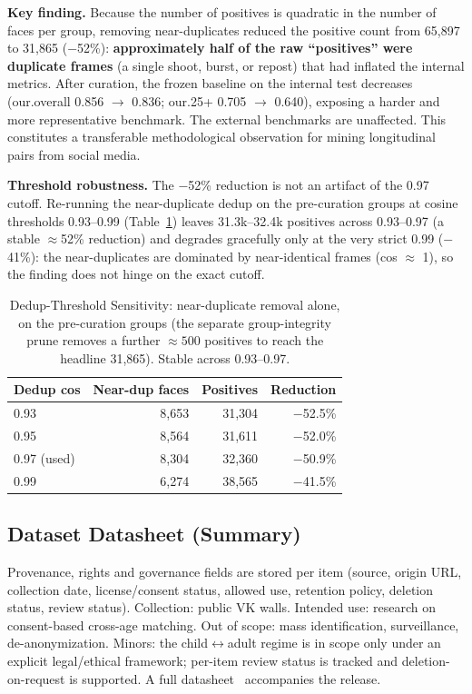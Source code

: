 \documentclass[journal]{IEEEtran}
\begin{document}
\textbf{Key finding.} Because the number of positives is quadratic in the number of faces per group, removing near-duplicates reduced the positive count from 65{,}897 to 31{,}865 ($-$52\%): \textbf{approximately half of the raw ``positives'' were duplicate frames} (a single shoot, burst, or repost) that had inflated the internal metrics. After curation, the frozen baseline on the internal test decreases (our.overall 0.856 $\rightarrow$ 0.836; our.25+ 0.705 $\rightarrow$ 0.640), exposing a harder and more representative benchmark. The external benchmarks are unaffected. This constitutes a transferable methodological observation for mining longitudinal pairs from social media.

\textbf{Threshold robustness.} The $-$52\% reduction is not an artifact of the 0.97 cutoff. Re-running the near-duplicate dedup on the pre-curation groups at cosine thresholds 0.93--0.99 (Table~\ref{tab:dedupsens}) leaves 31.3k--32.4k positives across 0.93--0.97 (a stable $\approx$52\% reduction) and degrades gracefully only at the very strict 0.99 ($-$41\%): the near-duplicates are dominated by near-identical frames (cos $\approx$ 1), so the finding does not hinge on the exact cutoff.

\begin{table}[!t]
\renewcommand{\arraystretch}{1.2}
\caption{Dedup-Threshold Sensitivity: near-duplicate removal alone, on the pre-curation groups (the separate group-integrity prune removes a further ${\approx}500$ positives to reach the headline 31{,}865). Stable across 0.93--0.97.}
\label{tab:dedupsens}
\centering
\footnotesize
\begin{tabular}{@{}lrrr@{}}
\toprule
Dedup cos & Near-dup faces & Positives & Reduction \\
\midrule
0.93 & 8{,}653 & 31{,}304 & $-$52.5\% \\
0.95 & 8{,}564 & 31{,}611 & $-$52.0\% \\
0.97 (used) & 8{,}304 & 32{,}360 & $-$50.9\% \\
0.99 & 6{,}274 & 38{,}565 & $-$41.5\% \\
\bottomrule
\end{tabular}
\end{table}

\subsection{Dataset Datasheet (Summary)}\label{sec:data-datasheet}
Provenance, rights and governance fields are stored per item (source, origin URL, collection date, license/consent status, allowed use, retention policy, deletion status, review status). Collection: public VK walls. Intended use: research on consent-based cross-age matching. Out of scope: mass identification, surveillance, de-anonymization. Minors: the child$\leftrightarrow$adult regime is in scope only under an explicit legal/ethical framework; per-item review status is tracked and deletion-on-request is supported. A full datasheet~\cite{gebru2021datasheets} accompanies the release.
\end{document}
